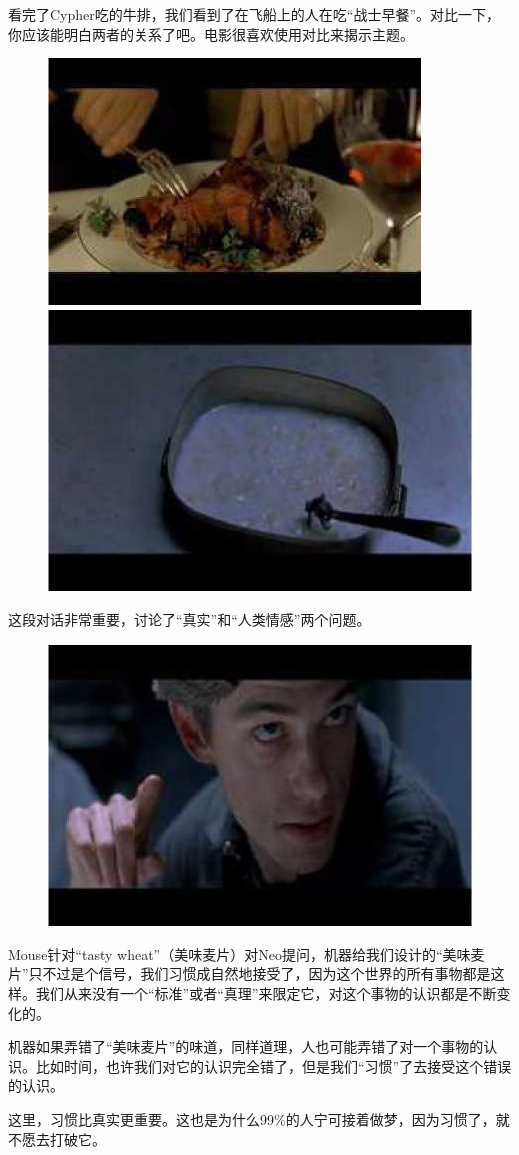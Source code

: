 \documentclass[UTF8]{ctexart}
\begin{document}
看完了Cypher吃的牛排，我们看到了在飞船上的人在吃“战士早餐”。对比一下，你应该能明白两者的关系了吧。电影很喜欢使用对比来揭示主题。

\begin{figure}[htb]
\centering
\includegraphics[width=0.45\linewidth]{fig/read_Matrix-37}
\includegraphics[width=0.45\linewidth]{fig/read_Matrix-38}
\end{figure}

这段对话非常重要，讨论了“真实”和“人类情感”两个问题。

\begin{figure}[htb]
\centering
\includegraphics[width=0.5\linewidth]{fig/read_Matrix-39}
\end{figure}

Mouse针对“tasty wheat”（美味麦片）对Neo提问，机器给我们设计的“美味麦片”只不过是个信号，我们习惯成自然地接受了，因为这个世界的所有事物都是这样。我们从来没有一个“标准”或者“真理”来限定它，对这个事物的认识都是不断变化的。

机器如果弄错了“美味麦片”的味道，同样道理，人也可能弄错了对一个事物的认识。比如时间，也许我们对它的认识完全错了，但是我们“习惯”了去接受这个错误的认识。

这里，习惯比真实更重要。这也是为什么99\%的人宁可接着做梦，因为习惯了，就不愿去打破它。
\end{document}
